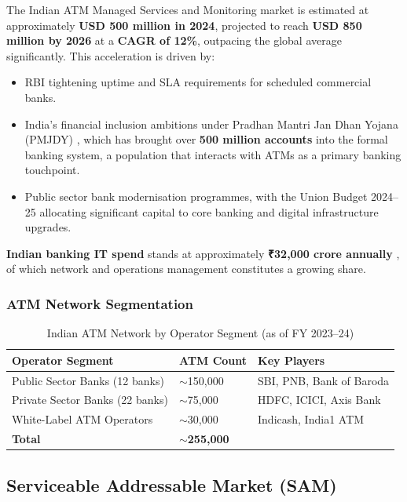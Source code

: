 \documentclass[12pt,a4paper]{article}
\newcommand{\inr}{₹}
\begin{document}
The Indian ATM Managed Services and Monitoring market is estimated at approximately
\textbf{USD 500 million in 2024}, projected to reach \textbf{USD 850 million by 2026} at a
\textbf{CAGR of 12\%}, outpacing the global average significantly. This acceleration is driven
by:

\begin{itemize}
  \item RBI tightening uptime and SLA requirements for scheduled commercial banks.
  \item India's financial inclusion ambitions under Pradhan Mantri Jan Dhan Yojana (PMJDY)
        \citep{pmjdy2024}, which has brought over \textbf{500 million accounts} into the formal
        banking system, a population that interacts with ATMs as a primary banking touchpoint.
  \item Public sector bank modernisation programmes, with the Union Budget 2024--25 allocating
        significant capital to core banking and digital infrastructure upgrades.
\end{itemize}

\textbf{Indian banking IT spend} stands at approximately \textbf{\inr{}32,000 crore annually}
\citep{nasscom2024}, of which network and operations management constitutes a growing share.

\subsubsection{ATM Network Segmentation}

\begin{table}[H]
\centering
\caption{Indian ATM Network by Operator Segment (as of FY 2023--24)}
\small
\begin{tabular}{@{}L{5.5cm} C{2.5cm} C{3.5cm}@{}}
\toprule
\textbf{Operator Segment} & \textbf{ATM Count} & \textbf{Key Players} \\
\midrule
Public Sector Banks (12 banks) & $\sim$150,000 & SBI, PNB, Bank of Baroda \\
Private Sector Banks (22 banks) & $\sim$75,000 & HDFC, ICICI, Axis Bank \\
White-Label ATM Operators & $\sim$30,000 & Indicash, India1 ATM \\
\midrule
\textbf{Total} & $\sim$\textbf{255,000} & \\
\bottomrule
\end{tabular}
\end{table}

\subsection{Serviceable Addressable Market (SAM)}
\end{document}
